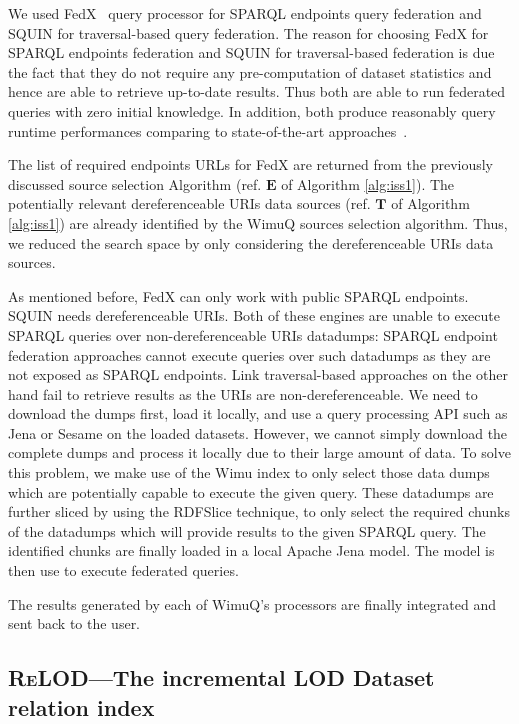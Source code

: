 \documentclass[sw]{iosart2x}
\begin{document}
We used FedX~\cite{fedx2011} query processor for SPARQL endpoints query federation and SQUIN for traversal-based query federation. The reason for choosing FedX for SPARQL endpoints federation and SQUIN for traversal-based federation is due the fact that they do not require any pre-computation of dataset statistics and hence are able to retrieve up-to-date results. Thus both are able to run federated queries with zero initial knowledge. In addition, both produce reasonably query runtime performances comparing to state-of-the-art approaches~\cite{saleem2015fine,saleem2018costfed,hartig2013squin}.

The list of required endpoints URLs for FedX are returned from the previously discussed source selection Algorithm (ref. $\mathbf{E}$ of Algorithm \ref{alg:iss1}). The potentially relevant dereferenceable URIs data sources (ref. $\mathbf{T}$ of Algorithm \ref{alg:iss1}) are already identified by the WimuQ sources selection algorithm. Thus, we reduced the search space by only considering the dereferenceable URIs data sources. 
 
As mentioned before, FedX can only work with public SPARQL endpoints.
SQUIN needs dereferenceable URIs.
Both of these engines are unable to execute SPARQL queries over non-dereferenceable URIs datadumps:
SPARQL endpoint federation approaches cannot execute queries over such datadumps as they are not exposed as SPARQL endpoints.
Link traversal-based approaches on the other hand fail to retrieve results as the URIs are non-dereferenceable.
We need to download the dumps first, load it locally, and use a query processing API such as Jena or Sesame on the loaded datasets.
However, we cannot simply download the complete dumps and process it locally due to their large amount of data.
To solve this problem, we make use of the Wimu index to only select those data dumps which are potentially capable to execute the given query.
These datadumps are further sliced by using the RDFSlice technique, to only select the required chunks of the datadumps which will provide results to the given SPARQL query.
The identified chunks are finally loaded in a local Apache Jena model.
The model is then use to execute federated queries.

The results generated by each of WimuQ's processors are finally integrated and sent back to the user.

\subsection{\textsc{ReLOD}---The incremental LOD Dataset relation index} \label{sec:relod}
\end{document}
